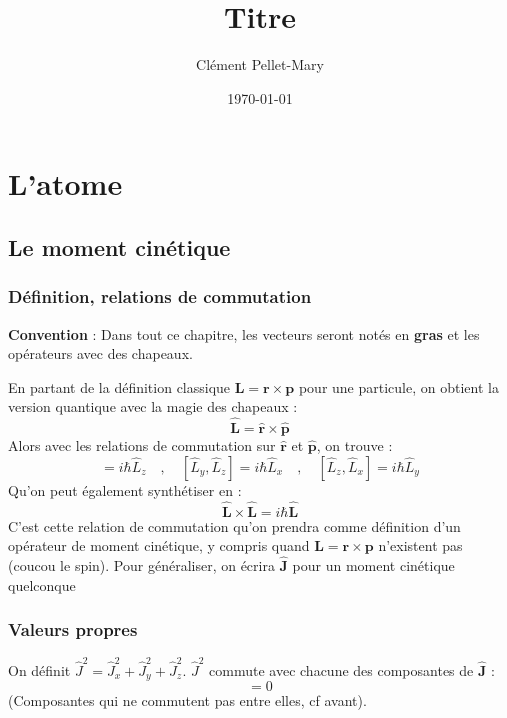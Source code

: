 \documentclass[a4paper]{report}
\title{Titre}
\author{Clément Pellet-Mary}
\date\today
\begin{document}
\chapter{L'atome}
  \section{Le moment cinétique}
  \subsection{Définition, relations de commutation}
  \textbf{Convention} : Dans tout ce chapitre, les vecteurs seront notés en \textbf{gras} et les opérateurs avec des chapeaux.
  
  En partant de la définition classique $\bm{L}=\bm{r} \times \bm{p}$ pour une particule, on obtient la version quantique avec la magie des chapeaux : \begin{equation}
  \hat{\bm{L}}=\hat{\bm{r}} \times \hat{ \bm p}
  \end{equation}
 Alors avec les relations de commutation sur $\hat{\bm{r}}$ et $\hat{ \bm p}$, on trouve : \begin{equation}
 [\hat L_x, \hat L_y]=i\hbar \hat L_z \quad , \quad [\hat L_y, \hat L_z]=i\hbar \hat L_x \quad , \quad [\hat L_z, \hat L_x]=i\hbar \hat L_y
 \end{equation}
 Qu'on peut également synthétiser en : \begin{equation}
 \hat{\bm L} \times \hat{\bm L} = i\hbar \hat{\bm L}
 \end{equation}
 C'est cette relation de commutation qu'on prendra comme définition d'un opérateur de moment cinétique, y compris quand $\bm{L}=\bm{r} \times \bm{p}$ n'existent pas (coucou le spin). Pour généraliser, on écrira $\hat{\bm J}$ pour un moment cinétique quelconque
 \subsection{Valeurs propres}
 On définit $\hat J^2= \hat J_x^2 + \hat J_y^2 + \hat J_z^2$. $ \hat J^2$ commute avec chacune des composantes de $\hat{\bm J}$ : \begin{equation}
 [\hat J^2, \hat{\bm J}]=0
\end{equation}  
(Composantes qui ne commutent pas entre elles, cf avant). 
\end{document}

